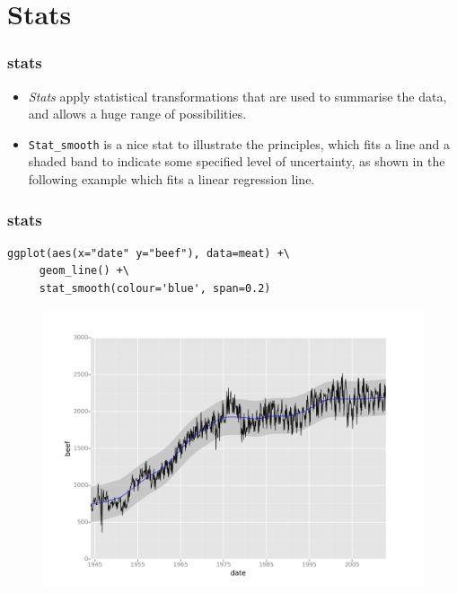 \documentclass{beamer}
\begin{document}
\section{Stats}
\begin{frame}
\frametitle{stats}
\Large
\begin{itemize}
\item \textit{Stats} apply statistical transformations that are used to summarise the data, and allows a huge range of possibilities. \item \texttt{Stat\_smooth} is a nice stat to illustrate the principles, which fits a line and a shaded band to indicate some specified level of uncertainty, as shown in the following example which fits a linear regression line.
\end{itemize}
\end{frame}
\begin{frame}[fragile]
\frametitle{stats}
\large
\vspace{-1.5cm}
\begin{framed}
\begin{verbatim}
ggplot(aes(x="date" y="beef"), data=meat) +\
     geom_line() +\
     stat_smooth(colour='blue', span=0.2)
\end{verbatim}
\end{framed}
\end{frame}
\begin{frame}
\begin{figure}
\centering
\includegraphics[width=1.1\linewidth]{stats1}
\end{figure}
\end{frame}
\end{document}
